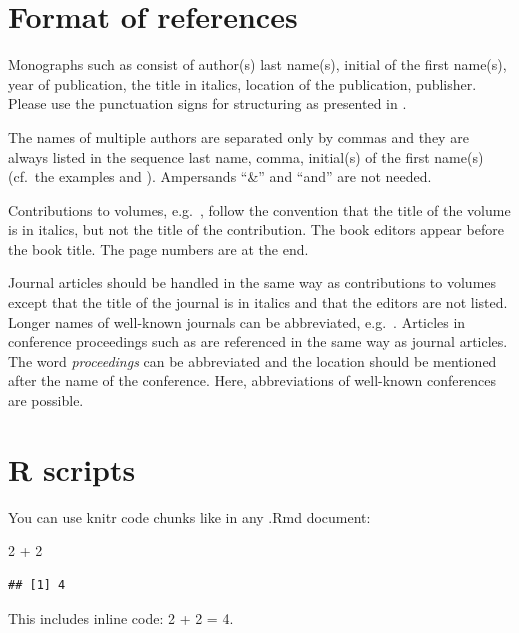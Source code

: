 \documentclass[
  a4paper,
  11pt,
  twocolumn]{article}
\newenvironment{Shaded}{\begin{snugshade}}{\end{snugshade}}
\newcommand{\DecValTok}[1]{\textcolor[rgb]{0.86,0.86,0.80}{#1}}
\newcommand{\SpecialCharTok}[1]{\textcolor[rgb]{0.86,0.64,0.64}{#1}}
\begin{document}
\section{Format of references}

Monographs such as \cite{Fant:1960} consist of author(s) last name(s),
initial of the first name(s), year of publication, the title in italics,
location of the publication, publisher. Please use the punctuation signs
for structuring as presented in \cite{Fant:1960}.

The names of multiple authors are separated only by commas and they are
always listed in the sequence last name, comma, initial(s) of the first
name(s) (cf.~the examples \cite{Beattie/etal:1982} and
\cite{Peterson/Barney:1952}). Ampersands ``\&'' and ``and'' are not
needed.

Contributions to volumes, e.g.~\cite{Stevens:1999}, follow the
convention that the title of the volume is in italics, but not the title
of the contribution. The book editors appear before the book title. The
page numbers are at the end.

Journal articles should be handled in the same way as contributions to
volumes except that the title of the journal is in italics and that the
editors are not listed. Longer names of well-known journals can be
abbreviated, e.g.~\cite{Peterson/Barney:1952}. Articles in conference
proceedings such as \cite{Ladefoged:2003} are referenced in the same way
as journal articles. The word \textit{proceedings} can be abbreviated
and the location should be mentioned after the name of the conference.
Here, abbreviations of well-known conferences are possible.

\section{R scripts}

You can use knitr code chunks like in any .Rmd document:

\begin{Shaded}
\begin{Highlighting}[]
\DecValTok{2} \SpecialCharTok{+} \DecValTok{2}
\end{Highlighting}
\end{Shaded}

\begin{verbatim}
## [1] 4
\end{verbatim}

This includes inline code: 2 + 2 = 4.
\end{document}
